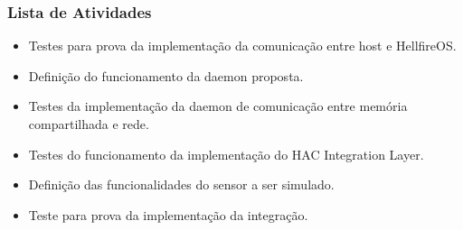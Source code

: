 \subsubsection{Lista de Atividades}
\begin{itemize}
\item Testes para prova da implementação da comunicação entre host e HellfireOS.
\item Definição do funcionamento da daemon proposta.
\item Testes da implementação da daemon de comunicação entre memória compartilhada e rede.
\item Testes do funcionamento da implementação do HAC Integration Layer.
\item Definição das funcionalidades do sensor a ser simulado.
\item Teste para prova da implementação da integração.
\end{itemize}

